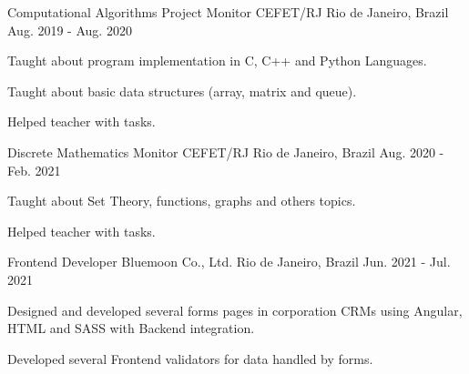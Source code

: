 

\begin{cventries}

  \cventry
    {Computational Algorithms Project Monitor} %
    {CEFET/RJ} %
    {Rio de Janeiro, Brazil} %
    {Aug. 2019 - Aug. 2020} %
    {
      \begin{cvitems} %
        \item {Taught about program implementation in C, C++ and Python Languages.}
        \item {Taught about basic data structures (array, matrix and queue).}
        \item {Helped teacher with tasks.}
      \end{cvitems}
    }

  \cventry
    {Discrete Mathematics Monitor} %
    {CEFET/RJ} %
    {Rio de Janeiro, Brazil} %
    {Aug. 2020 - Feb. 2021} %
    {
      \begin{cvitems} %
        \item {Taught about Set Theory, functions, graphs and others topics.}
        \item {Helped teacher with tasks.}
      \end{cvitems}
    }

  \cventry
    {Frontend Developer} %
    {Bluemoon Co., Ltd.} %
    {Rio de Janeiro, Brazil} %
    {Jun. 2021 - Jul. 2021} %
    {
      \begin{cvitems} %
        \item {Designed and developed several forms pages in corporation CRMs using Angular, HTML and SASS with Backend integration.}
        \item {Developed several Frontend validators for data handled by forms.}
      \end{cvitems}
    }


\end{cventries}
